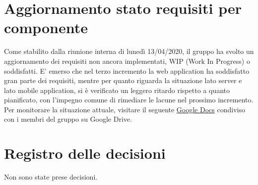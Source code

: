 \documentclass{article}
\begin{document}
\section{Aggiornamento stato requisiti per componente}%
\label{sec:aggiornamento_stato_requisiti_per_componente}

Come stabilito dalla riunione interna di lunedì 13/04/2020, il gruppo ha svolto un aggiornamento dei requisiti non ancora implementati, WIP (Work In Progress) o soddisfatti.
E' emerso che nel terzo incremento la web application ha soddisfatto gran parte dei requisiti, mentre per quanto riguarda la situazione lato server e lato mobile application, si è verificato un leggero ritardo rispetto a quanto pianificato, con l'impegno comune di rimediare le lacune nel prossimo incremento.
Per monitorare la situazione attuale, visitare il seguente \href{https://docs.google.com/spreadsheets/d/1J-RbNrb1yN_X1rVlKzpP9rjaiGst8B62k1K6EHY-grU/edit#gid=0}{Google Docs} condiviso con i membri del gruppo su Google Drive.

\newpage
\section{Registro delle decisioni}%
\label{sec:registro_delle_decisioni}

Non sono state prese decisioni.

\end{document}
